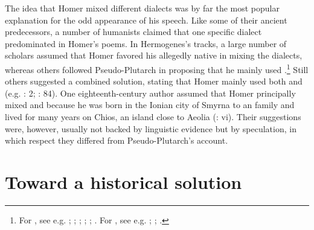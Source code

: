 The idea that Homer mixed different dialects was by far the most popular explanation for the odd appearance of his speech. Like some of their ancient predecessors, a number of humanists claimed that one specific dialect predominated in Homer’s poems. In Hermogenes’s tracks, a large number of scholars assumed that Homer favored his allegedly native  in mixing the dialects, whereas others followed Pseudo-Plutarch in proposing that he mainly used .\footnote{For , see e.g. ; \citet[215]{Ringelbergh1541}; \citet[167]{Labbe1639}; \citet[\textsc{b.3}\textsc{\textsuperscript{v}}]{KirchmaierCrusius1684}; \citet[b.2\textsc{\textsuperscript{r}}, 334]{Nibbe1725}; \citet[161]{Gesner1774}. For , see e.g. \citet[\textsc{f.}v\textsc{\textsuperscript{r}}]{Codro1502}; \citet[96\textsc{\textsuperscript{r}}]{Waser1610}; \citet[514]{Fabricius1711}.} Still others suggested a combined solution, stating that Homer mainly used both  and  (e.g. \citealt{Schmidt1604}: 2; \citealt{Rhenius1626}: 84). One eighteenth-century author assumed that Homer principally mixed  and  because he was born in the Ionian city of Smyrna to an  family and lived for many years on Chios, an  island close to Aeolia (\citealt{Reynolds1752}: vi). Their suggestions were, however, usually not backed by linguistic evidence but by speculation, in which respect they differed from Pseudo-Plutarch’s account.

\section{Toward a historical solution}\label{sec:4.3}

